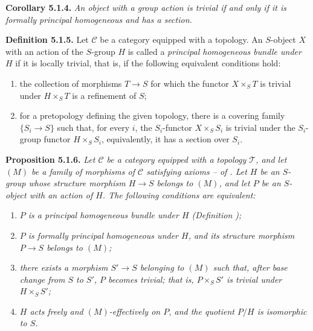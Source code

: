\medskip
\noindent{}\textbf{Corollary 5.1.4.}
\textit{An object with a group action is trivial if and only if it is
formally principal homogeneous and has a section.}

\medskip
\noindent{}\textbf{Definition 5.1.5.}
Let \(\mathscr C\) be a category equipped with a topology. An \(S\)-object
\(X\) with an action of the \(S\)-group \(H\) is called a
\emph{principal homogeneous bundle under \(H\)} if it is locally trivial,
that is, if the following equivalent conditions hold:
\begin{enumerate}
  \item[(i)] the collection of morphisms \(T\to S\) for which the functor
  \(X\times_ST\) is trivial under \(H\times_ST\) is a refinement of \(S\);
  \item[(ii)] for a pretopology defining the given topology, there is a
  covering family \(\{S_i\to S\}\) such that, for every \(i\), the
  \(S_i\)-functor \(X\times_SS_i\) is trivial under the \(S_i\)-group
  functor \(H\times_SS_i\), equivalently, it has a section over \(S_i\).
\end{enumerate}


\medskip
\noindent{}\textbf{Proposition 5.1.6.}
\textit{Let \(\mathscr C\) be a category equipped with a topology
\(\mathcal T\), and let \((M)\) be a family of morphisms of \(\mathscr C\)
satisfying axioms -- of . Let \(H\) be an
\(S\)-group whose structure morphism \(H\to S\) belongs to \((M)\), and let
\(P\) be an \(S\)-object with an action of \(H\). The following conditions
are equivalent:}
\begin{enumerate}
  \item[(i)] \textit{\(P\) is a principal homogeneous bundle under \(H\)
  (Definition );}
  \item[(ii)] \textit{\(P\) is formally principal homogeneous under \(H\),
  and its structure morphism \(P\to S\) belongs to \((M)\);}
  \item[(iii)] \textit{there exists a morphism \(S'\to S\) belonging to
  \((M)\) such that, after base change from \(S\) to \(S'\), \(P\) becomes
  trivial; that is, \(P\times_SS'\) is trivial under \(H\times_SS'\);}
  \item[(iv)] \textit{\(H\) acts freely and \((M)\)-effectively on \(P\),
  and the quotient \(P/H\) is isomorphic to \(S\).}
\end{enumerate}

